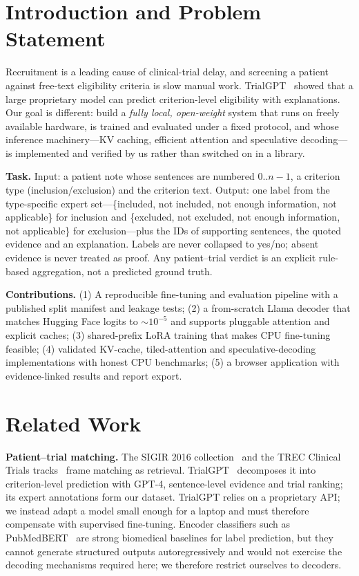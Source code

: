 \documentclass[conference]{IEEEtran}
\begin{document}
\section{Introduction and Problem Statement}
Recruitment is a leading cause of clinical-trial delay, and screening a patient against free-text eligibility criteria is slow manual work. TrialGPT~\cite{jin2024trialgpt} showed that a large proprietary model can predict criterion-level eligibility with explanations. Our goal is different: build a \emph{fully local, open-weight} system that runs on freely available hardware, is trained and evaluated under a fixed protocol, and whose inference machinery---KV caching, efficient attention and speculative decoding---is implemented and verified by us rather than switched on in a library.

\textbf{Task.} Input: a patient note whose sentences are numbered $0..n{-}1$, a criterion type (inclusion/exclusion) and the criterion text. Output: one label from the type-specific expert set---\{included, not included, not enough information, not applicable\} for inclusion and \{excluded, not excluded, not enough information, not applicable\} for exclusion---plus the IDs of supporting sentences, the quoted evidence and an explanation. Labels are never collapsed to yes/no; absent evidence is never treated as proof. Any patient--trial verdict is an explicit rule-based aggregation, not a predicted ground truth.

\textbf{Contributions.} (1) A reproducible fine-tuning and evaluation pipeline with a published split manifest and leakage tests; (2) a from-scratch Llama decoder that matches Hugging Face logits to $\sim$$10^{-5}$ and supports pluggable attention and explicit caches; (3) shared-prefix LoRA training that makes CPU fine-tuning feasible; (4) validated KV-cache, tiled-attention and speculative-decoding implementations with honest CPU benchmarks; (5) a browser application with evidence-linked results and report export.

\section{Related Work}
\textbf{Patient--trial matching.} The SIGIR 2016 collection~\cite{koopman2016test} and the TREC Clinical Trials tracks~\cite{roberts2021trec} frame matching as retrieval. TrialGPT~\cite{jin2024trialgpt} decomposes it into criterion-level prediction with GPT-4, sentence-level evidence and trial ranking; its expert annotations form our dataset. TrialGPT relies on a proprietary API; we instead adapt a model small enough for a laptop and must therefore compensate with supervised fine-tuning. Encoder classifiers such as PubMedBERT~\cite{gu2021pubmedbert} are strong biomedical baselines for label prediction, but they cannot generate structured outputs autoregressively and would not exercise the decoding mechanisms required here; we therefore restrict ourselves to decoders.
\end{document}
